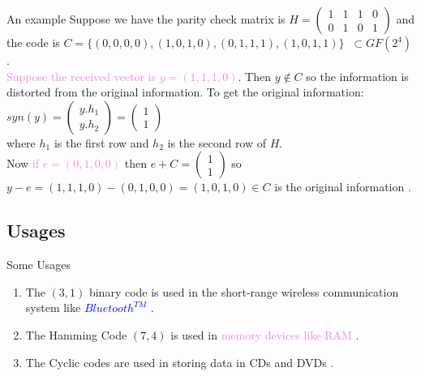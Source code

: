 \documentclass{beamer}
\begin{document}
\begin{frame}{An example}
Suppose we have the parity check matrix is \(H=\begin{pmatrix}
    1 & 1 & 1 & 0\\
    0 & 1 & 0 & 1
  \end{pmatrix}\) and the code is   \(C=\{(0,0,0,0),(1,0,1,0),(0,1,1,1),(1,0,1,1)\} \;\; \subset GF(2^{4})\).\\[5mm]

  \textcolor{violet}{Suppose the received vector is \(y=(1,1,1,0)\)}. Then \(y \not \in C\) so the information is distorted from the original information. To get the original information:\\
  \(syn(y)= \begin{pmatrix}
    y.h_1 \\ y.h_2
  \end{pmatrix} = \begin{pmatrix}
    1 \\ 1
  \end{pmatrix}\) \\
  where \(h_1\) is the first row and \(h_2\) is the second row of \(H\).\\[5mm]
  Now \textcolor{violet}{if \(e=(0,1,0,0)\)} then \(e+C=\begin{pmatrix}
    1 \\ 1
  \end{pmatrix}\) so \(y-e=(1,1,1,0)-(0,1,0,0)=(1,0,1,0) \in C\) is the original information \cite{error_correct}.
\end{frame}
\subsection{Usages}
\begin{frame}{Some Usages}
  \begin{enumerate}
  \item The \((3,1)\) binary code is used in the short-range wireless communication system like \textcolor{blue}{\(Bluetooth^{TM}\)} \cite{wireless}.

    \vspace{3mm}
  \item The Hamming Code \((7,4)\) is used in \textcolor{violet}{memory devices like RAM} \cite{coding}.

\vspace{3mm}
  \item The Cyclic codes are used in storing data in \textcolor{green!50!black}{CDs and DVDs} \cite{coding}.
  \end{enumerate}
\end{frame}
\end{document}
